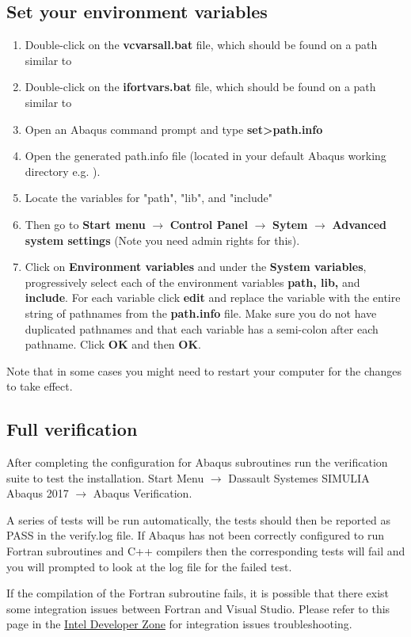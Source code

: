 \documentclass[10pt,a4paper,oneside]{article}
\begin{document}
\subsection{Set your environment variables}
\begin{enumerate}
\item Double-click on the \textbf{vcvarsall.bat} file, which should be found on a path similar to\\
\item Double-click on the \textbf{ifortvars.bat} file, which should be found on a path similar to\\
\item Open an Abaqus command prompt and type \textbf{set>path.info}
\item Open the generated path.info file (located in your default Abaqus working directory e.g. ).
\item Locate the variables for "path", "lib", and "include"
\item Then go to \textbf{Start menu} $\rightarrow$ \textbf{Control Panel} $\rightarrow$ \textbf{Sytem} $\rightarrow$ \textbf{Advanced system settings} (Note you need admin rights for this).
\item Click on \textbf{Environment variables} and under the \textbf{System variables}, progressively select each of the environment variables \textbf{path, lib,} and \textbf{ include}. For each variable click \textbf{edit} and replace the variable with the entire string of pathnames from the \textbf{path.info} file. Make sure you do not have duplicated pathnames and that each variable has a semi-colon after each pathname. Click \textbf{OK} and then \textbf{OK}.
\end{enumerate}

Note that in some cases you might need to restart your computer for the changes to take effect.

\subsection{Full verification}
After completing the configuration for Abaqus subroutines run the verification suite to test the installation. 
Start Menu $\rightarrow$ Dassault Systemes SIMULIA Abaqus 2017 $\rightarrow$ Abaqus Verification.

A series of tests will be run automatically, the tests should then be reported as PASS in the verify.log file. If Abaqus has not been correctly configured to run Fortran subroutines and C++ compilers then the corresponding tests will fail and you will prompted to look at the log file for the failed test.
 
 If the compilation of the Fortran subroutine fails, it is possible that there exist some integration issues between Fortran and Visual Studio. Please refer to this page in the \href{https://software.intel.com/en-us/articles/troubleshooting-fortran-integration-issues-with-visual-studio}{Intel Developer Zone} for integration issues troubleshooting.
\end{document}
